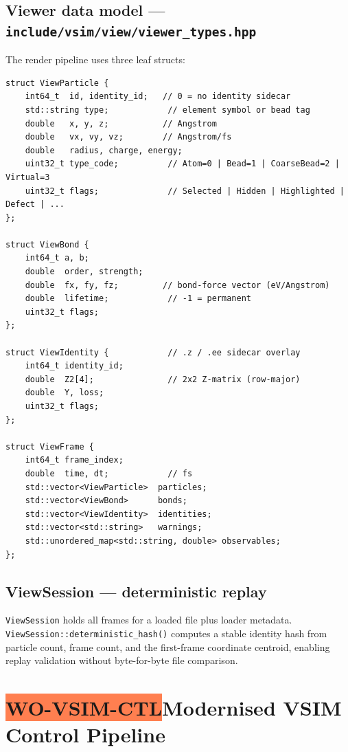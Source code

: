 ﻿\documentclass[11pt,a4paper]{article}
\newcommand{\chip}[2]{%
  \colorbox{#1}{\color{white}\bfseries\tiny\MakeUppercase{#2}}}
\begin{document}
\subsection*{Viewer data model --- \texttt{include/vsim/view/viewer\_types.hpp}}

The render pipeline uses three leaf structs:

\begin{lstlisting}
struct ViewParticle {
    int64_t  id, identity_id;   // 0 = no identity sidecar
    std::string type;            // element symbol or bead tag
    double   x, y, z;           // Angstrom
    double   vx, vy, vz;        // Angstrom/fs
    double   radius, charge, energy;
    uint32_t type_code;          // Atom=0 | Bead=1 | CoarseBead=2 | Virtual=3
    uint32_t flags;              // Selected | Hidden | Highlighted | Defect | ...
};

struct ViewBond {
    int64_t a, b;
    double  order, strength;
    double  fx, fy, fz;         // bond-force vector (eV/Angstrom)
    double  lifetime;            // -1 = permanent
    uint32_t flags;
};

struct ViewIdentity {            // .z / .ee sidecar overlay
    int64_t identity_id;
    double  Z2[4];               // 2x2 Z-matrix (row-major)
    double  Y, loss;
    uint32_t flags;
};

struct ViewFrame {
    int64_t frame_index;
    double  time, dt;            // fs
    std::vector<ViewParticle>  particles;
    std::vector<ViewBond>      bonds;
    std::vector<ViewIdentity>  identities;
    std::vector<std::string>   warnings;
    std::unordered_map<std::string, double> observables;
};
\end{lstlisting}

\subsection*{ViewSession --- deterministic replay}

\texttt{ViewSession} holds all frames for a loaded file plus loader metadata.
\texttt{ViewSession::deterministic\_hash()} computes a stable identity hash from
particle count, frame count, and the first-frame coordinate centroid, enabling
replay validation without byte-for-byte file comparison.

\newpage
\section{\texorpdfstring{\chip{Coral}{WO-VSIM-CTL}}{WO-VSIM-CTL}\enspace Modernised VSIM Control Pipeline}
\label{sec:ctl}
\end{document}
